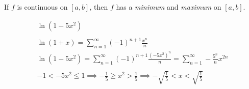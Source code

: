 \documentclass[00_complete]{subfiles}
\begin{document}
\begin{definition}
    If $f$ is continuous on $[a,b]$, then $f$ has a \emph{minimum} and
    \emph{maximum} on $[a,b]$.
\end{definition}

\begin{example}
    $$
    \begin{gathered}
        \ln(1-5x^2) \\
        \\
        \ln(1+x) = \sum_{n=1}^{\infty} (-1)^{n+1} \frac{x^n}{n} \\
        \ln(1-5x^2) = \sum_{n=1}^{\infty} (-1)^{n+1} \frac{(-5x^2)^n}{n} =
        \sum_{n=1}^{\infty}- \frac{5^n}{n}x^{2n} \\
        \\
        -1 < -5x^2 \leq 1 \implies -\frac{1}{5} \geq x^2 > \frac{1}{5} \implies
        -\sqrt{\frac{1}{5}} < x < \sqrt{\frac{1}{5}}
    \end{gathered}
    $$
\end{example}
\end{document}
